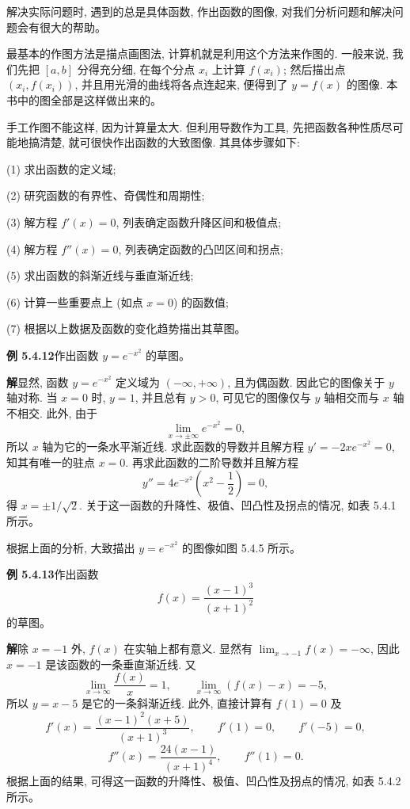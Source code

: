 \documentclass[UTF8, 12pt, fontset=fandol, oneside]{ctexart}
\begin{document}
解决实际问题时, 遇到的总是具体函数, 作出函数的图像, 对我们分析问题和解决问题会有很大的帮助。

最基本的作图方法是描点画图法, 计算机就是利用这个方法来作图的. 一般来说, 我们先把 $[a,b]$ 分得充分细, 在每个分点 $x_i$ 上计算 $f(x_i)$; 然后描出点 $(x_i,f(x_i))$, 并且用光滑的曲线将各点连起来, 便得到了 $y=f(x)$ 的图像. 本书中的图全部是这样做出来的。

手工作图不能这样, 因为计算量太大. 但利用导数作为工具, 先把函数各种性质尽可能地搞清楚, 就可很快作出函数的大致图像. 其具体步骤如下:

(1) 求出函数的定义域;

(2) 研究函数的有界性、奇偶性和周期性;

(3) 解方程 $f'(x)=0$, 列表确定函数升降区间和极值点;

(4) 解方程 $f''(x)=0$, 列表确定函数的凸凹区间和拐点;

(5) 求出函数的斜渐近线与垂直渐近线;

(6) 计算一些重要点上 (如点 $x=0$) 的函数值;

(7) 根据以上数据及函数的变化趋势描出其草图。

\noindent\textbf{例 5.4.12}\quad 作出函数 $y=e^{-x^2}$ 的草图。

\noindent\textbf{解}\quad 显然, 函数 $y=e^{-x^2}$ 定义域为 $(-\infty,+\infty)$, 且为偶函数. 因此它的图像关于 $y$ 轴对称. 当 $x=0$ 时, $y=1$, 并且总有 $y>0$, 可见它的图像仅与 $y$ 轴相交而与 $x$ 轴不相交. 此外, 由于
\[
  \lim_{x\to\pm\infty}e^{-x^2}=0,
\]
所以 $x$ 轴为它的一条水平渐近线. 求此函数的导数并且解方程 $y'=-2xe^{-x^2}=0$, 知其有唯一的驻点 $x=0$. 再求此函数的二阶导数并且解方程
\[
  y''=4e^{-x^2}\left(x^2-\frac12\right)=0,
\]
得 $x=\pm1/\sqrt2$. 关于这一函数的升降性、极值、凹凸性及拐点的情况, 如表 5.4.1 所示。

根据上面的分析, 大致描出 $y=e^{-x^2}$ 的图像如图 5.4.5 所示。

\noindent\textbf{例 5.4.13}\quad 作出函数
\[
  f(x)=\frac{(x-1)^3}{(x+1)^2}
\]
的草图。

\noindent\textbf{解}\quad 除 $x=-1$ 外, $f(x)$ 在实轴上都有意义. 显然有 $\lim_{x\to-1}f(x)=-\infty$, 因此 $x=-1$ 是该函数的一条垂直渐近线. 又
\[
  \lim_{x\to\infty}\frac{f(x)}x=1,\qquad
  \lim_{x\to\infty}(f(x)-x)=-5,
\]
所以 $y=x-5$ 是它的一条斜渐近线. 此外, 直接计算有 $f(1)=0$ 及
\[
  f'(x)=\frac{(x-1)^2(x+5)}{(x+1)^3},\qquad
  f'(1)=0,\qquad f'(-5)=0,
\]
\[
  f''(x)=\frac{24(x-1)}{(x+1)^4},\qquad f''(1)=0.
\]
根据上面的结果, 可得这一函数的升降性、极值、凹凸性及拐点的情况, 如表 5.4.2 所示。
\end{document}
